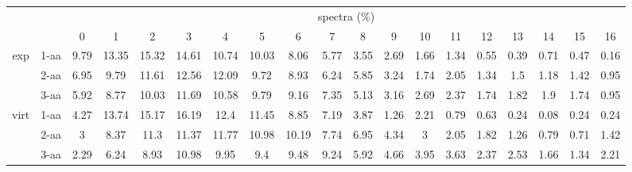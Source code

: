 \documentclass{article}[12pt]
\begin{document}
\begin{landscape}
\begin{table}[h]\tiny
\vspace{3mm}
{\centering
\begin{center}
\begin{tabular}{|c|l|c|c|c|c|c|c|c|c|c|c|c|c|c|c|c|c|c|}
  \hline
  \multicolumn{2}{|c|}{ } & \multicolumn{ 17 }{|c|}{ spectra (\%)} \\
  \cline{3- 19}
  \multicolumn{2}{|c|}{ }  & 0 & 1 & 2 & 3 & 4 & 5 & 6 & 7 & 8 & 9 & 10 & 11 & 12 & 13 & 14 & 15 & 16\\
  \hline
  \multirow{3}{*}{exp}
&  1-aa  & 9.79 & 13.35 & 15.32 & 14.61 & 10.74 & 10.03 & 8.06 & 5.77 & 3.55 & 2.69 & 1.66 & 1.34 & 0.55 & 0.39 & 0.71 & 0.47 & 0.16\\
&  2-aa  & 6.95 & 9.79 & 11.61 & 12.56 & 12.09 & 9.72 & 8.93 & 6.24 & 5.85 & 3.24 & 1.74 & 2.05 & 1.34 & 1.5 & 1.18 & 1.42 & 0.95\\
&  3-aa  & 5.92 & 8.77 & 10.03 & 11.69 & 10.58 & 9.79 & 9.16 & 7.35 & 5.13 & 3.16 & 2.69 & 2.37 & 1.74 & 1.82 & 1.9 & 1.74 & 0.95\\
 \hline
  \multirow{3}{*}{virt} 
&  1-aa  & 4.27 & 13.74 & 15.17 & 16.19 & 12.4 & 11.45 & 8.85 & 7.19 & 3.87 & 1.26 & 2.21 & 0.79 & 0.63 & 0.24 & 0.08 & 0.24 & 0.24\\
&  2-aa  & 3 & 8.37 & 11.3 & 11.37 & 11.77 & 10.98 & 10.19 & 7.74 & 6.95 & 4.34 & 3 & 2.05 & 1.82 & 1.26 & 0.79 & 0.71 & 1.42\\
&  3-aa  & 2.29 & 6.24 & 8.93 & 10.98 & 9.95 & 9.4 & 9.48 & 9.24 & 5.92 & 4.66 & 3.95 & 3.63 & 2.37 & 2.53 & 1.66 & 1.34 & 2.21\\
 \hline
\end{tabular}
\end{center}
\par}
\centering
\vspace{3mm}
\end{table}


\end{landscape}
\end{document}
